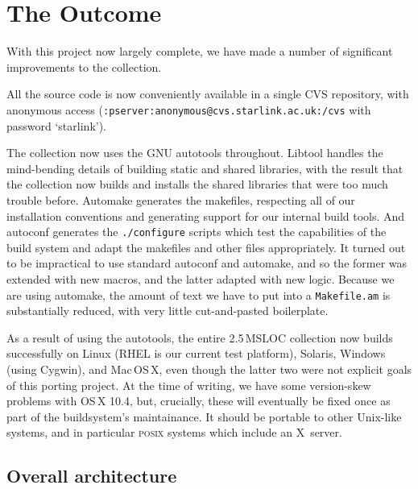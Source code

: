 \documentclass{speauth}
\begin{document}
\section{The Outcome}
\label{s:result}

With this project now largely complete, we have made a number of
significant improvements to the collection.

All the source code is now conveniently available in a single CVS
repository, with anonymous access
(\texttt{:pserver:anonymous@cvs.starlink.ac.uk:/cvs} with password `starlink').

The collection now uses the GNU autotools throughout.  Libtool handles the
mind-bending details of building static and shared libraries, with the
result that the collection now builds and installs the shared
libraries that were too much trouble before.  Automake generates the
makefiles, respecting all of our installation conventions and
generating support for our internal build tools.  And autoconf
generates the \texttt{./configure} scripts which test the capabilities
of the build system and adapt the makefiles and other files
appropriately.  It turned out to be impractical to use standard
autoconf and automake, and so the former was extended with new macros,
and the latter adapted with new logic.  Because we are using automake,
the amount of text we have to put into a \texttt{Makefile.am} is
substantially reduced, with very little cut-and-pasted boilerplate.

As a result of using the autotools, the entire 2.5\,MSLOC collection
now builds successfully on Linux (RHEL is our current test platform),
Solaris, Windows (using Cygwin), and Mac\,OS\,X, even though the
latter two were not explicit goals of this porting project.  At the
time of writing, we have some version-skew problems with OS\,X 10.4,
but, crucially, these will eventually be fixed once as part of the
buildsystem's maintainance.  It should
be portable to other Unix-like systems, and in particular
\textsc{posix} systems which include an X~server.

\subsection{Overall architecture}
\label{s:arch}
\end{document}
